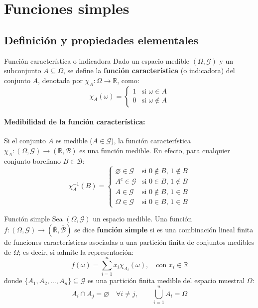 \newpage
\section{Funciones simples}
\subsection{Definición y propiedades elementales}

\begin{definicion}{Función característica o indicadora}
Dado un espacio medible $(\Omega, \mathcal{G})$ y un subconjunto $A \subseteq \Omega$, se define la \textbf{función característica} (o indicadora) del conjunto $A$, denotada por $\chi_A : \Omega \to \mathbb{R}$, como:
\[
    \chi_A(\omega) = \begin{cases}
        1 & \text{si } \omega \in A \\[4pt]
        0 & \text{si } \omega \notin A
    \end{cases}
\]
\end{definicion}

\paragraph{Medibilidad de la función característica:}
Si el conjunto $A$ es medible ($A \in \mathcal{G}$), la función característica $\chi_A : (\Omega, \mathcal{G}) \to (\mathbb{R}, \mathcal{B})$ es una función medible. En efecto, para cualquier conjunto boreliano $B \in \mathcal{B}$:
\[
    \chi_A^{-1}(B) = \begin{cases}
        \varnothing \in \mathcal{G} & \text{si } 0 \notin B, \, 1 \notin B \\[4pt]
        A^c \in \mathcal{G} & \text{si } 0 \in B, \, 1 \notin B \\[4pt]
        A \in \mathcal{G} & \text{si } 0 \notin B, \, 1 \in B \\[4pt]
        \Omega \in \mathcal{G} & \text{si } 0 \in B, \, 1 \in B
    \end{cases}
\]

\begin{definicion}{Función simple}
Sea $(\Omega, \mathcal{G})$ un espacio medible. Una función $f : (\Omega, \mathcal{G}) \to (\overline{\mathbb{R}}, \overline{\mathcal{B}})$ se dice \textbf{función simple} si es una combinación lineal finita de funciones características asociadas a una partición finita de conjuntos medibles de $\Omega$; es decir, si admite la representación:
\[
    f(\omega) = \sum_{i=1}^n x_i \chi_{A_i}(\omega), \quad \text{con } x_i \in \mathbb{R}
\]
donde $\{A_1, A_2, \dots, A_n\} \subseteq \mathcal{G}$ es una partición finita medible del espacio muestral $\Omega$:
\[
    A_i \cap A_j = \varnothing \quad \forall i \neq j, \qquad \bigcup_{i=1}^n A_i = \Omega
\]
\end{definicion}

